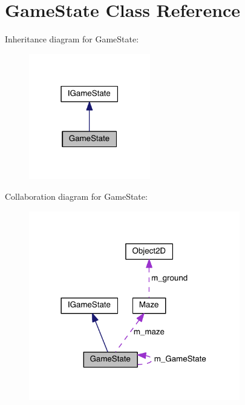 \hypertarget{class_game_state}{}\section{Game\+State Class Reference}
\label{class_game_state}


Inheritance diagram for Game\+State\+:\nopagebreak
\begin{figure}[H]
\begin{center}
\leavevmode
\includegraphics[width=150pt]{class_game_state__inherit__graph}
\end{center}
\end{figure}


Collaboration diagram for Game\+State\+:\nopagebreak
\begin{figure}[H]
\begin{center}
\leavevmode
\includegraphics[width=261pt]{class_game_state__coll__graph}
\end{center}
\end{figure}
